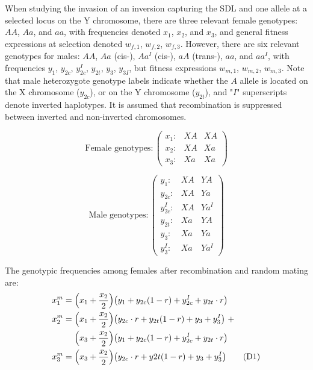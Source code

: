 \documentclass{article}
\newcommand\numberthis{\addtocounter{equation}{1}\tag{\theequation}}
\begin{document}
When studying the invasion of an inversion capturing the SDL and one allele at a selected locus on the Y chromosome, there are three relevant female genotypes: $AA$, $Aa$, and $aa$, with frequencies denoted $x_1$, $x_2$, and $x_3$, and general fitness expressions at selection denoted $w_{f,1}$, $w_{f,2}$, $w_{f,3}$. However, there are six relevant genotypes for males: $AA$, $Aa$ (cis-), $Aa^I$ (cis-), $aA$ (trans-), $aa$, and $aa^I$, with frequencies $y_{1}$, $y_{2c}$, $y^I_{2c}$, $y_{2t}$, $y_{3}$, $y_{3I}$, but fitness expressions $w_{m,1}$, $w_{m,2}$, $w_{m,3}$. Note that male heterozygote genotype labels indicate whether the $A$ allele is located on the X chromosome ($y_{2c}$), or on the Y chromosome ($y_{2t}$), and "$I$" superscripts denote inverted haplotypes. It is assumed that recombination is suppressed between inverted and non-inverted chromosomes.

\begin{equation*}
	\text{Female genotypes}:\left( \begin{array}{cc|c}
		x_1: & XA & XA \\
		x_2: & XA & Xa \\
		x_3: & Xa & Xa 
	\end{array} \right)
\end{equation*}

\begin{equation*}
	\text{Male genotypes}:\left( \begin{array}{cc|c}
		y_1:     & XA & YA \\
		y_{2c}:   & XA & Ya \\
		y^I_{2c}: & XA & Ya^I \\
		y_{2t}:   & Xa & YA \\
		y_{3}:    & Xa & Ya \\
		y^I_{3}:  & Xa & Ya^I 
	\end{array} \right)
\end{equation*}

\noindent The genotypic frequencies among females after recombination and random mating are:
\begin{align*}
	x^m_{1} &= \Big( x_1 + \frac{x_2}{2} \Big) \big(y_1 + y_{2c}(1 - r) + y^I_{2c} + y_{2t} \cdot r \big) \\
	x^m_{2} &= \Big( x_1 + \frac{x_2}{2} \Big) \big( y_{2c} \cdot r + y_{2t}(1 - r) + y_3 + y^I_3 \big)~+ \\
	&~~~~\Big( x_3 + \frac{x_2}{2} \Big) \big( y_{1} + y_{2c}(1 - r) + y^I_{2c} + y_{2t} \cdot r \big)      \\
	x^m_{3} &= \Big( x_3 + \frac{x_2}{2} \Big) \big(y_{2c} \cdot r + y{2t}(1 - r) + y_{3} + y^I_3  \big) \numberthis
\end{align*}
\end{document}
